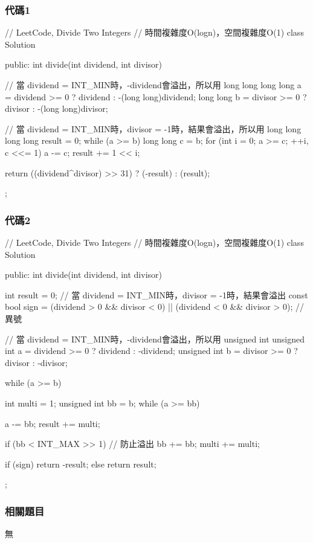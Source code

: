 \subsubsection{代碼1}
\begin{Code}
// LeetCode, Divide Two Integers
// 時間複雜度O(logn)，空間複雜度O(1)
class Solution {
public:
    int divide(int dividend, int divisor) {
        // 當 dividend = INT_MIN時，-dividend會溢出，所以用 long long
        long long a = dividend >= 0 ? dividend : -(long long)dividend;
        long long b = divisor >= 0 ? divisor : -(long long)divisor;

        // 當 dividend = INT_MIN時，divisor = -1時，結果會溢出，所以用 long long
        long long result = 0;
        while (a >= b) {
            long long c = b;
            for (int i = 0; a >= c; ++i, c <<= 1) {
                a -= c;
                result += 1 << i;
            }
        }

        return ((dividend^divisor) >> 31) ? (-result) : (result);
    }
};
\end{Code}


\subsubsection{代碼2}
\begin{Code}
// LeetCode, Divide Two Integers
// 時間複雜度O(logn)，空間複雜度O(1)
class Solution {
public:
    int divide(int dividend, int divisor) {
        int result = 0; // 當 dividend = INT_MIN時，divisor = -1時，結果會溢出
        const bool sign = (dividend > 0 && divisor < 0) ||
                (dividend < 0 && divisor > 0); // 異號

        // 當 dividend = INT_MIN時，-dividend會溢出，所以用 unsigned int
        unsigned int a = dividend >= 0 ? dividend : -dividend;
        unsigned int b = divisor >= 0 ? divisor : -divisor;

        while (a >= b) {
            int multi = 1;
            unsigned int bb = b;
            while (a >= bb) {
                a -= bb;
                result += multi;

                if (bb < INT_MAX >> 1) { // 防止溢出
                    bb += bb;
                    multi += multi;
                }
            }
        }
        if (sign) return -result;
        else return result;
    }
};
\end{Code}


\subsubsection{相關題目}
\begindot
\item 無
\myenddot


